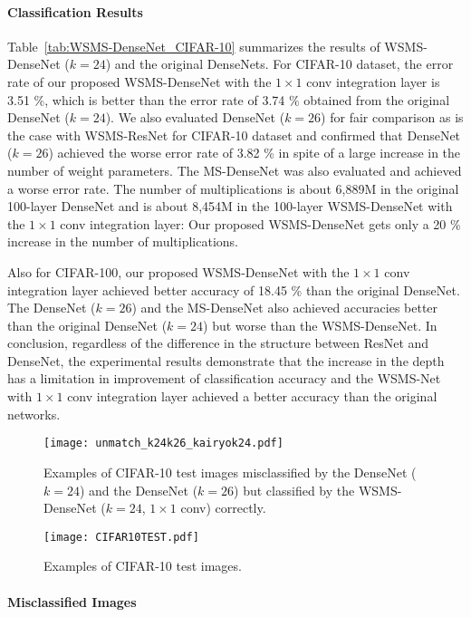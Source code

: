 \documentclass[journal]{IEEEtran}
\begin{document}
\paragraph*{\textbf{Classification Results}}

Table~\ref{tab:WSMS-DenseNet_CIFAR-10} summarizes the results of WSMS-DenseNet ($k=24$) and the original DenseNets.
For CIFAR-10 dataset, the error rate of our proposed WSMS-DenseNet with the $1\times1$ conv integration layer is 3.51 \%, which is better than the error rate of 3.74 \% obtained from the original DenseNet ($k=24$).
We also evaluated DenseNet ($k=26$) for fair comparison as is the case with WSMS-ResNet for CIFAR-10 dataset and confirmed that DenseNet ($k=26$) achieved the worse error rate of 3.82 \% in spite of a large increase in the number of weight parameters.
The MS-DenseNet was also evaluated and achieved a worse error rate.
The number of multiplications is about 6,889M in the original 100-layer DenseNet and is about 8,454M in the 100-layer WSMS-DenseNet with the $1\times1$ conv integration layer: Our proposed WSMS-DenseNet gets only a 20 \% increase in the number of multiplications.

Also for CIFAR-100, our proposed WSMS-DenseNet with the $1\times1$ conv integration layer achieved better accuracy of 18.45 \% than the original DenseNet.
The DenseNet ($k=26$) and the MS-DenseNet also achieved accuracies better than the original DenseNet ($k=24$) but worse than the WSMS-DenseNet.
In conclusion, regardless of the difference in the structure between ResNet and DenseNet, the experimental results demonstrate that the increase in the depth has a limitation in improvement of classification accuracy and the WSMS-Net with $1\times1$ conv integration layer achieved a better accuracy than the original networks.


\begin{figure}[!t]
\centering
\texttt{[image: unmatch\_k24k26\_kairyok24.pdf]}
\caption{Examples of CIFAR-10 test images misclassified by the DenseNet ($k=24$) and the DenseNet ($k=26$) but classified by the WSMS-DenseNet ($k=24$, $1\times1$ conv) correctly.}
\label{fig:ScaleResult24}
\vspace*{1cm}
\centering
\texttt{[image: CIFAR10TEST.pdf]}
\caption{Examples of CIFAR-10 test images.}
\label{fig:CIFAR10TEST}
\end{figure}

\paragraph*{\textbf{Misclassified Images}}
\end{document}
